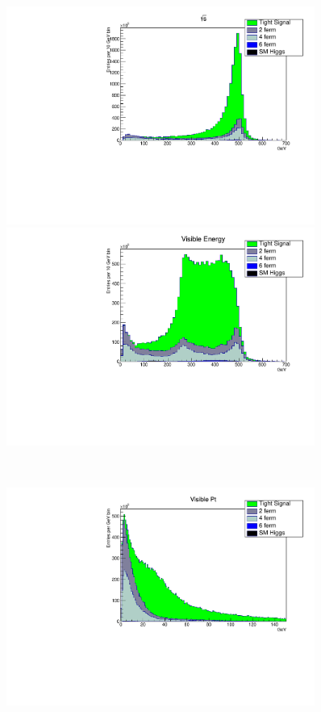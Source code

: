\begin{figure}
 \centering
    \begin{minipage}{0.49\textwidth}
        \centering
        \includegraphics[width=0.9\textwidth]{EcomHist.pdf} %
        
    \end{minipage}\hfill
    \begin{minipage}{0.49\textwidth}
        \centering
        \includegraphics[width=0.9\textwidth]{EvisHist.pdf} %
        
     \end{minipage}\\

	
 \centering
    \begin{minipage}{0.49\textwidth}
        \centering
        \includegraphics[width=0.9\textwidth]{PtvisHist.pdf} %
   

\end{minipage}
\end{figure}
